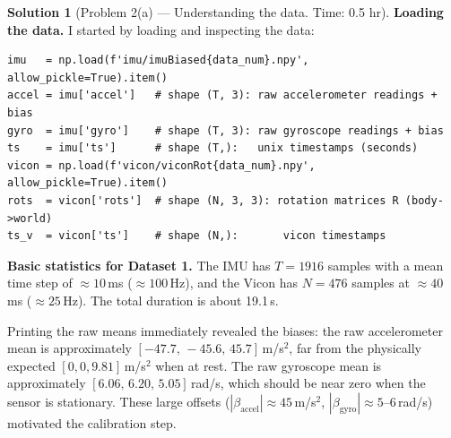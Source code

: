 \documentclass[11pt, reqno, letterpaper]{amsart}
\theoremstyle{plain}
\theoremstyle{definition}
\newtheorem{solution}[theorem]{Solution}
\begin{document}
\begin{solution}[Problem 2(a) — Understanding the data. Time: 0.5 hr]

\textbf{Loading the data.}
I started by loading and inspecting the data:

\begin{lstlisting}
imu   = np.load(f'imu/imuBiased{data_num}.npy', allow_pickle=True).item()
accel = imu['accel']   # shape (T, 3): raw accelerometer readings + bias
gyro  = imu['gyro']    # shape (T, 3): raw gyroscope readings + bias
ts    = imu['ts']      # shape (T,):   unix timestamps (seconds)
vicon = np.load(f'vicon/viconRot{data_num}.npy', allow_pickle=True).item()
rots  = vicon['rots']  # shape (N, 3, 3): rotation matrices R (body->world)
ts_v  = vicon['ts']    # shape (N,):       vicon timestamps
\end{lstlisting}

\textbf{Basic statistics for Dataset 1.}
The IMU has $T=1916$ samples with a mean time step of $\approx10$\,ms
($\approx100$\,Hz), and the Vicon has $N=476$ samples at $\approx40$\,ms
($\approx25$\,Hz).  The total duration is about 19.1\,s.

Printing the raw means immediately revealed the biases:
the raw accelerometer mean is approximately
$[-47.7,\,-45.6,\,45.7]$\,m/s$^2$, far from the physically expected
$[0,0,9.81]$\,m/s$^2$ when at rest.
The raw gyroscope mean is approximately $[6.06,\,6.20,\,5.05]$\,rad/s,
which should be near zero when the sensor is stationary.
These large offsets ($|\beta_\text{accel}|\approx45$\,m/s$^2$,
$|\beta_\text{gyro}|\approx5$--6\,rad/s) motivated the calibration step.
\end{solution}
\end{document}
